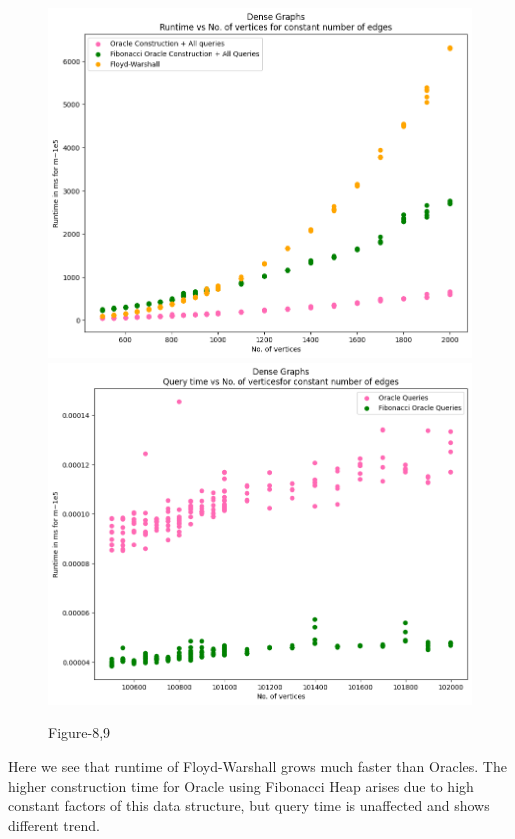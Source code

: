 \documentclass[12pt, a4paper]{article}
\begin{document}
    \begin{figure}[H]
    \caption*{Figure-8,9}
    \includegraphics[scale=0.4]{./images/8}
    \includegraphics[scale=0.4]{./images/9}
        \centering
    \end{figure} 
 
    Here we see that runtime of Floyd-Warshall grows much faster than Oracles. The higher construction time for Oracle using Fibonacci Heap arises due to high constant factors of this data structure, but query time is unaffected and shows different trend.
\end{document}
